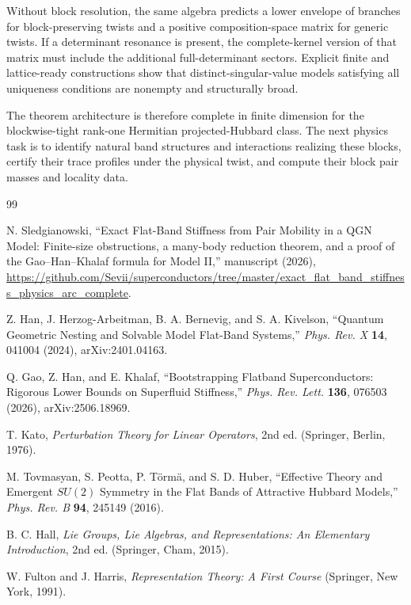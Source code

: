 \documentclass[11pt]{article}
\numberwithin{equation}{section}
\begin{document}
Without block resolution, the same algebra predicts a lower envelope of branches for block-preserving twists and a positive composition-space matrix for generic twists.  If a determinant resonance is present, the complete-kernel version of that matrix must include the additional full-determinant sectors.  Explicit finite and lattice-ready constructions show that distinct-singular-value models satisfying all uniqueness conditions are nonempty and structurally broad.

The theorem architecture is therefore complete in finite dimension for the blockwise-tight rank-one Hermitian projected-Hubbard class.  The next physics task is to identify natural band structures and interactions realizing these blocks, certify their trace profiles under the physical twist, and compute their block pair masses and locality data.

\begin{thebibliography}{99}

N. Sledgianowski,
``Exact Flat-Band Stiffness from Pair Mobility in a QGN Model: Finite-size obstructions, a many-body reduction theorem, and a proof of the Gao--Han--Khalaf formula for Model II,'' manuscript (2026),
\url{https://github.com/Sevii/superconductors/tree/master/exact_flat_band_stiffness_physics_arc_complete}.

Z. Han, J. Herzog-Arbeitman, B. A. Bernevig, and S. A. Kivelson,
``Quantum Geometric Nesting and Solvable Model Flat-Band Systems,''
\emph{Phys. Rev. X} \textbf{14}, 041004 (2024), arXiv:2401.04163.

Q. Gao, Z. Han, and E. Khalaf,
``Bootstrapping Flatband Superconductors: Rigorous Lower Bounds on Superfluid Stiffness,''
\emph{Phys. Rev. Lett.} \textbf{136}, 076503 (2026), arXiv:2506.18969.

T. Kato,
\emph{Perturbation Theory for Linear Operators}, 2nd ed. (Springer, Berlin, 1976).

M. Tovmasyan, S. Peotta, P. T\"orm\"a, and S. D. Huber,
``Effective Theory and Emergent $SU(2)$ Symmetry in the Flat Bands of Attractive Hubbard Models,''
\emph{Phys. Rev. B} \textbf{94}, 245149 (2016).

B. C. Hall,
\emph{Lie Groups, Lie Algebras, and Representations: An Elementary Introduction}, 2nd ed. (Springer, Cham, 2015).

W. Fulton and J. Harris,
\emph{Representation Theory: A First Course} (Springer, New York, 1991).

\end{thebibliography}
\end{document}
